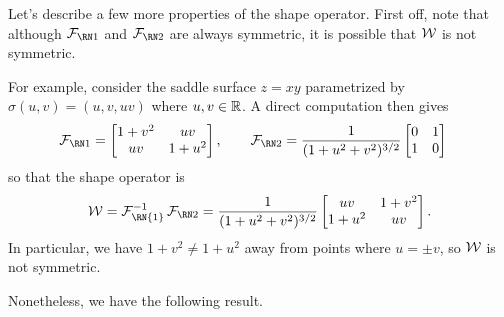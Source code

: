 Let's describe a few more properties of the shape operator. First off, 
note that although $\FFF$ and $\SFF$ are always symmetric, it is possible 
that ${\cal W}$ is not symmetric. 

For example, consider the saddle surface $z = xy$ parametrized by 
$\sigma(u, v) = (u, v, uv)$ where $u, v \in \mathbb{R}$. A direct computation then gives 
\begin{align*}
    \FFF &= \begin{bmatrix}
        1+v^2 & uv \\ uv & 1+u^2
    \end{bmatrix}, \qquad \SFF = \frac{1}{(1+u^2+v^2)^{3/2}} \begin{bmatrix}
        0 & 1 \\ 1 & 0 
    \end{bmatrix}
\end{align*}
so that the shape operator is 
\[ {\cal W} = {\cal F}_{\text{\RN{1}}}^{-1} \SFF = \frac{1}{(1+u^2+v^2)^{3/2}} \begin{bmatrix}
    uv & 1+v^2 \\ 1+u^2 & uv 
\end{bmatrix}. \] 
In particular, we have $1+v^2 \neq 1+u^2$ away from points where $u = \pm v$, 
so ${\cal W}$ is not symmetric.

Nonetheless, we have the following result. 

